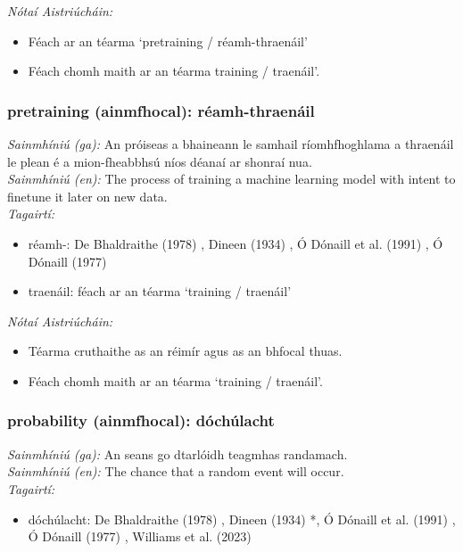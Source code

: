  \noindent \textit{Nótaí Aistriúcháin:}
\begin{itemize}
	\item Féach ar an téarma `pretraining / réamh-thraenáil'
	\item Féach chomh maith ar an téarma training / traenáil'.
\end{itemize}


\subsubsection*{pretraining (ainmfhocal): réamh-thraenáil}
 \noindent \textit{Sainmhíniú (ga):} An próiseas a bhaineann le samhail ríomhfhoghlama a thraenáil le plean é a mion-fheabbhsú níos déanaí ar shonraí nua.
\\
 \noindent \textit{Sainmhíniú (en):} The process of training a machine learning model with intent to finetune it later on new data.
\\
 \noindent \textit{Tagairtí:}
\begin{itemize}
	\item réamh-: De Bhaldraithe (1978) \cite{de-bhaldraithe}, Dineen (1934) \cite{dineen}, Ó Dónaill et al. (1991) \cite{focloir-beag}, Ó Dónaill (1977) \cite{odonaill}
	\item traenáil: féach ar an téarma `training / traenáil'
\end{itemize}

 \noindent \textit{Nótaí Aistriúcháin:}
\begin{itemize}
	\item Téarma cruthaithe as an réimír agus as an bhfocal thuas.
	\item Féach chomh maith ar an téarma `training / traenáil'.
\end{itemize}


\subsubsection*{probability (ainmfhocal): dóchúlacht}
 \noindent \textit{Sainmhíniú (ga):} An seans go dtarlóidh teagmhas randamach.
\\
 \noindent \textit{Sainmhíniú (en):} The chance that a random event will occur.
\\
 \noindent \textit{Tagairtí:}
\begin{itemize}
	\item dóchúlacht: De Bhaldraithe (1978) \cite{de-bhaldraithe}, Dineen (1934) \cite{dineen}*, Ó Dónaill et al. (1991) \cite{focloir-beag}, Ó Dónaill (1977) \cite{odonaill}, Williams et al. (2023) \cite{storchiste}
\end{itemize}

